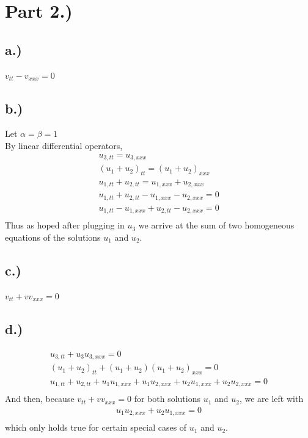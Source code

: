 \documentclass{article}
\begin{document}
\section*{Part 2.)}
\subsection*{a.)} 
$v_{tt} - v_{xxx} = 0$
\subsection*{b.)}
Let $\alpha = \beta = 1$\\

\noindent By linear differential operators, 
\begin{equation}
\begin{aligned}
u_{3, tt} = u_{3, xxx} \\
(u_{1} + u_{2})_{tt} = (u_{1} + u_{2})_{xxx}\\
u_{1, tt} + u_{2, tt} = u_{1, xxx} + u_{2, xxx}\\
u_{1, tt} + u_{2, tt} - u_{1, xxx} - u_{2, xxx} = 0\\
u_{1, tt} - u_{1, xxx} + u_{2, tt} - u_{2, xxx} = 0\\
\end{aligned}
\end{equation}
Thus as hoped after plugging in $u_{3}$ we arrive at the sum of two homogeneous equations of the solutions $u_1$ and $u_2$.
\subsection*{c.)}
$v_{tt} + vv_{xxx} = 0$\\

\subsection*{d.)}
\begin{equation}
\begin{aligned}
u_{3, tt} + u_3u_{3,xxx} = 0\\
(u_1 + u_2)_{tt} + (u_1 + u_2)(u_1 + u_2)_{xxx} = 0\\
u_{1, tt} + u_{2, tt} + u_1u_{1, xxx} + u_1u_{2, xxx} + u_2u_{1, xxx} + u_2u_{2, xxx} = 0\\
\end{aligned}
\end{equation}
And then, because $v_{tt} + vv_{xxx} = 0$ for both solutions $u_1$ and $u_2$, we are left with
\begin{equation}
\begin{aligned}
u_1u_{2, xxx} + u_2u_{1, xxx} = 0\\
\end{aligned}
\end{equation}
which only holds true for certain special cases of $u_1$ and $u_2$.
\end{document}
